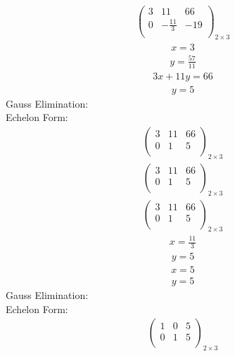 \documentclass{article}
\begin{document}
\begin{align*}
\left(
\begin{array}{cc|c}
3 & 11 & 66\\
0 & -\frac{11}{3} & -19\\
\end{array}
\right)_{2\times 3}
\end{align*}
\begin{align*}
x=3\end{align*}
\begin{align*}
y=\frac{57}{11}\end{align*}
\begin{align*}
3x + 11y=66\end{align*}
\begin{align*}
y=5\end{align*}
Gauss Elimination:\\
Echelon Form:\\
\begin{align*}
\left(
\begin{array}{cc|c}
3 & 11 & 66\\
0 & 1 & 5\\
\end{array}
\right)_{2\times 3}
\end{align*}
\begin{align*}
\left(
\begin{array}{cc|c}
3 & 11 & 66\\
0 & 1 & 5\\
\end{array}
\right)_{2\times 3}
\end{align*}
\begin{align*}
\left(
\begin{array}{cc|c}
3 & 11 & 66\\
0 & 1 & 5\\
\end{array}
\right)_{2\times 3}
\end{align*}
\begin{align*}
x=\frac{11}{3}\end{align*}
\begin{align*}
y=5\end{align*}
\begin{align*}
x=5\end{align*}
\begin{align*}
y=5\end{align*}
Gauss Elimination:\\
Echelon Form:\\
\begin{align*}
\left(
\begin{array}{cc|c}
1 & 0 & 5\\
0 & 1 & 5\\
\end{array}
\right)_{2\times 3}
\end{align*}
\end{document}
